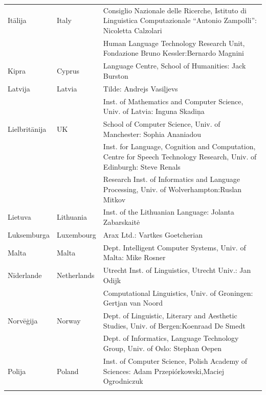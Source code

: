 \begin{longtable}{@{}llp{113mm}@{}}
  Itālija & \textcolor{grey1}{Italy} & Consiglio Nazionale delle Ricerche, Istituto di Linguistica Computazionale “Antonio Zampolli”: Nicoletta Calzolari\\ \addlinespace
  & & Human Language Technology Research Unit, Fondazione Bruno Kessler:\newline Bernardo Magnini\\ \addlinespace 
  Kipra & \textcolor{grey1}{Cyprus} & Language Centre, School of Humanities: Jack Burston\\ \addlinespace 
  Latvija & \textcolor{grey1}{Latvia} & Tilde: Andrejs Vasiļjevs\\ \addlinespace 
  & & Inst. of Mathematics and Computer Science, Univ. of Latvia: Inguna Skadiņa\\ \addlinespace
  Lielbritānija & \textcolor{grey1}{UK} &  School of Computer Science, Univ. of Manchester: Sophia Ananiadou \\ \addlinespace 
  & & Inst. for Language, Cognition and Computation, Centre for Speech Technology Research, Univ. of Edinburgh: Steve Renals \\ \addlinespace 
  & & Research Inst. of Informatics and Language Processing, Univ. of Wolverhampton:\newline Ruslan Mitkov \\ \addlinespace 
  Lietuva & \textcolor{grey1}{Lithuania} & Inst. of the Lithuanian Language: Jolanta Zabarskaitė\\ \addlinespace
  Luksemburga & \textcolor{grey1}{Luxembourg} & Arax Ltd.: Vartkes Goetcherian\\ \addlinespace
  Malta & \textcolor{grey1}{Malta} & Dept. Intelligent Computer Systems, Univ. of Malta: Mike Rosner\\ \addlinespace
  Nīderlande & \textcolor{grey1}{Netherlands} & Utrecht Inst. of Linguistics, Utrecht Univ.: Jan Odijk\\ \addlinespace 
  & & Computational Linguistics, Univ. of Groningen: Gertjan van Noord\\ \addlinespace
  Norvēģija & \textcolor{grey1}{Norway} & Dept. of Linguistic, Literary and Aesthetic Studies, Univ. of Bergen:\newline Koenraad De Smedt\\ \addlinespace 
  & & Dept. of Informatics, Language Technology Group, Univ. of Oslo: Stephan Oepen \\ \addlinespace
  Polija & \textcolor{grey1}{Poland} & Inst. of Computer Science, Polish Academy of Sciences: Adam Przepiórkowski,\newline Maciej Ogrodniczuk \\ \addlinespace

\end{longtable}
